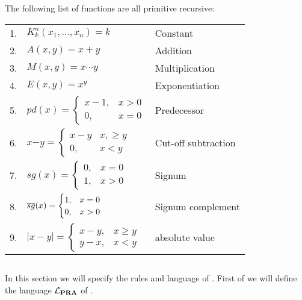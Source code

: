 \documentclass[../main.tex]{subfiles}
\begin{document}
\begin{prop}
	The following list of functions are all primitive recursive:
\begin{table}[!ht]
\begin{tabular}{p{1cm}p{6cm}p{5cm}}
	1.& $K^n_k(x_1,\ldots,x_n)=k$  & Constant  \\
	2.& $A(x,y)=x+y$ &Addition  \\
	3.&$M(x,y)=x\cdots y$  &Multiplication  \\
	4.&$E(x,y)=x^y$  &Exponentiation  \\
	5.&$pd(x)=\begin{cases}
		x-1, &x>0\\
		0,& x=0
	\end{cases}$&  Predecessor\\
		6.&$x\dot - y=\begin{cases}
			x-y&x,\geq y\\
			0,& x<y
		\end{cases}$  &Cut-off subtraction  \\
			7.&$sg(x)=\begin{cases}
				0,&x=0\\
				1,&x>0
			\end{cases}$& Signum \\
				8.& $\overline{sg}(x)=\begin{cases}
				1,&x=0\\
				0,&x>0
			\end{cases}$& Signum complement  \\
				9.& $|x-y|=\begin{cases}
				x-y,&x\geq y\\
				y-x,& x<y
			\end{cases}$& absolute value  \\
\end{tabular}
\end{table}
\end{prop}

\subsection{\PRA}
In this section we will specify the rules and language of \PRA. First of we
will define the language $\mathcal{L}_{\text{\textbf{PRA}}}$ of \PRA.
\end{document}
